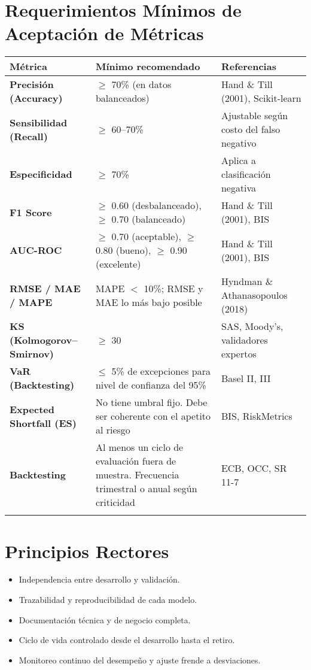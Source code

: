 \documentclass[11pt,oneside]{article}%
\begin{document}
\section{Requerimientos Mínimos de Aceptación de Métricas}
{\tiny
\begin{longtable}{>{\bfseries}p{3.5cm} p{5cm} p{4.6cm}}
\toprule
\rowcolor{ficoblue}
\color{white}\textbf{Métrica}  &\color{white}\textbf{Mínimo recomendado}& \color{white}\textbf{Referencias} \\
 \midrule
Precisión (Accuracy)  & $\geq$ 70\% (en datos balanceados)  & Hand \& Till (2001), Scikit-learn \\
\addlinespace
Sensibilidad (Recall)  & $\geq$ 60–70\%                                   & Ajustable según costo del falso negativo \\
\addlinespace
Especificidad              &   $\geq$ 70\%                                       & Aplica a clasificación negativa \\
\addlinespace
F1 Score                     &   $\geq$ 0.60 (desbalanceado), $\geq$ 0.70 (balanceado) & Hand \& Till (2001), BIS \\
\addlinespace
AUC-ROC                  &  $\geq$ 0.70 (aceptable), $\geq$ 0.80 (bueno), $\geq$ 0.90 (excelente)  & Hand \& Till (2001), BIS \\
\addlinespace
RMSE / MAE / MAPE  & MAPE $<$ 10\%; RMSE y MAE lo más bajo posible & Hyndman \& Athanasopoulos (2018) \\ 
\addlinespace
KS (Kolmogorov–Smirnov)       & $\geq$ 30 & SAS, Moody’s, validadores expertos \\
\addlinespace
VaR (Backtesting)             & $\leq$ 5\% de excepciones para nivel de confianza del 95\%  &  Basel II, III  \\
\addlinespace
Expected Shortfall (ES)   & No tiene umbral fijo. Debe ser coherente con el apetito al riesgo &  BIS, RiskMetrics  \\
\addlinespace
Backtesting     &  Al menos un ciclo de evaluación fuera de muestra. Frecuencia trimestral o anual según criticidad & ECB, OCC, SR 11-7 \\
\addlinespace
\bottomrule
\end{longtable}
}
\section{Principios Rectores}
\begin{itemize}
\item Independencia entre desarrollo y validación. 
\item Trazabilidad y reproducibilidad de cada modelo. 
\item Documentación técnica y de negocio completa. 
\item Ciclo de vida controlado desde el desarrollo hasta el retiro. 
\item Monitoreo continuo del desempeño y ajuste frende a desviaciones. 
\end{itemize}
\end{document}
